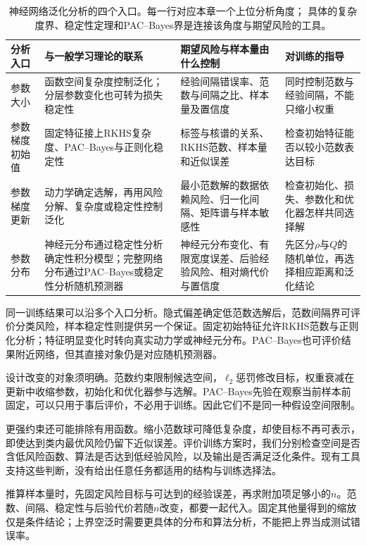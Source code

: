 \begin{table}[!htb]
 \centering
 \small
 \begin{tabular}{p{24mm}p{43mm}p{46mm}p{38mm}}
 \toprule
 分析入口 & 与一般学习理论的联系 & 期望风险与样本量由什么控制 & 对训练的指导\\
 \midrule
 参数大小 & 函数空间复杂度控制泛化；分层参数变化也可转为损失稳定性 & 经验间隔错误率、范数与间隔之比、样本量及置信度 & 同时控制范数与经验间隔，不能只缩小权重\\
 参数梯度初始值 & 固定特征接上RKHS复杂度、PAC--Bayes与正则化稳定性 & 标签与核谱的关系、RKHS范数、样本量和近似误差 & 检查初始特征能否以较小范数表达目标\\
 参数梯度更新 & 动力学确定选解，再用风险分解、复杂度或稳定性控制泛化 & 最小范数解的数据依赖风险、归一化间隔、矩阵谱与样本敏感性 & 检查初始化、损失、参数化和优化器怎样共同选择解\\
 参数分布 & 神经元分布通过稳定性分析确定性积分模型；完整网络分布通过PAC--Bayes或稳定性分析随机预测器 & 神经元分布变化、有限宽度误差、后验经验风险、相对熵代价与置信度 & 先区分$\rho$与$Q$的随机单位，再选择相应距离和泛化结论\\
 \bottomrule
 \end{tabular}
 \caption{神经网络泛化分析的四个入口。每一行对应本章一个上位分析角度；
 具体的复杂度界、稳定性定理和PAC--Bayes界是连接该角度与期望风险的工具。}
 \label{tab:deep-generalization-routes}
\end{table}

同一训练结果可以沿多个入口分析。隐式偏差确定低范数选解后，范数间隔界可评价分类风险，样本稳定性则提供另一个保证。固定初始特征允许RKHS范数与正则化分析；特征明显变化时转向真实动力学或神经元分布。PAC--Bayes也可评价结果附近网络，但其直接对象仍是对应随机预测器。

设计改变的对象须明确。范数约束限制候选空间，$\ell_2$惩罚修改目标，权重衰减在更新中收缩参数，初始化和优化器参与选解。PAC--Bayes先验在观察当前样本前固定，可以只用于事后评价，不必用于训练。因此它们不是同一种假设空间限制。

更强约束还可能排除有用函数。缩小范数球可降低复杂度，却使目标不再可表示，即使达到类内最优风险仍留下近似误差。评价训练方案时，我们分别检查空间是否含低风险函数、算法是否达到低经验风险，以及输出是否满足泛化条件。现有工具支持这些判断，没有给出任意任务都适用的结构与训练选择法。

推算样本量时，先固定风险目标与可达到的经验误差，再求附加项足够小的$n$。范数、间隔、稳定性与后验代价若随$n$改变，都要一起代入。固定其他量得到的缩放仅是条件结论；上界空泛时需要更具体的分布和算法分析，不能把上界当成测试错误率。

